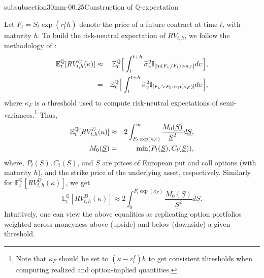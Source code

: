 \documentclass[11pt]{article}
\makeatletter
\renewcommand\subsubsection{\@startsection%
    {subsubsection}{3}{0mm}{-0\baselineskip}{0.25\baselineskip}{\itshape\large}}
\makeatother
\begin{document}


\subsubsection{Construction of $\mathbb{Q}$-expectation}\label{SecQexp}

Let $F_{t}=S_t\exp(r_{t}^f h)$ denote the price of a future contract at time $t$, with maturity $h$. To build the risk-neutral expectation of $RV_{t,h}$, we follow the methodology of \cite{AndersenBondarenko07}:
\begin{eqnarray}
\mathbb{E}_t^{\mathbb{Q}}[RV^{U}_{t,h}(\kappa)]&\approx& \mathbb{E}_t^{%
\mathbb{Q}}\Big[\int_t^{t+h}\widetilde{\sigma}^2_\upsilon\mathbb{I}_{[\ln(F_\upsilon/F_t)>\kappa_{F}]}d\upsilon%
\Big], \notag \\
&=&\mathbb{E}_t^{\mathbb{Q}}\Big[\int_t^{t+h}\widetilde{\sigma}^2_\upsilon\mathbb{I}%
_{[F_\upsilon>F_t\exp(\kappa_{F})]}d\upsilon\Big],    \notag
\end{eqnarray}
where $\kappa_{F}$ is a threshold used to compute risk-neutral expectations of semi-variances.\footnote{Note that $\kappa_{F}$ should be set to $(\kappa-r_{t}^f)h$ to get consistent thresholds when computing realized and option-implied quantities.}
Thus,
\begin{eqnarray}
\mathbb{E}_t^{\mathbb{Q}}[RV^{U}_{t,h}(\kappa)] &\approx& 2\int_{F_t\exp(\kappa_{F})}^{\infty}\frac{M_0(\underline{S})}{\underline{S}^2}d\underline{S}, \label{EqUpEMM} \\
M_0(\underline{S}) &=& \min(P_t(\underline{S}), C_t(\underline{S})), \notag
\end{eqnarray}
where, $P_t(\underline{S}), C_t(\underline{S})$, and $\underline{S}$ are prices of European put and call options (with maturity $h$), and the strike price of the underlying asset, respectively. Similarly for $\mathbb{E}_t^{\mathbb{Q}}[RV^{D}_{t,h}(\kappa)]$, we get
\begin{equation}  \label{EqDownEMM}
\mathbb{E}_t^{\mathbb{Q}}[RV^{D}_{t,h}(\kappa)] \approx
2\int^{F_t\exp(\kappa_{F})}_{0}\frac{M_0(\underline{S})}{\underline{S}^2}d\underline{S}.
\end{equation}
Intuitively, one can view the above equalities as replicating option portfolios weighted across moneyness above (upside) and below (downside) a given threshold.
\end{document}
